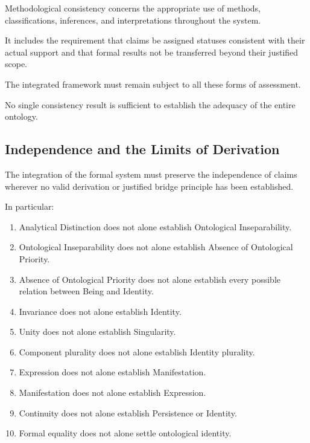 Methodological consistency
concerns the
appropriate use
of methods,
classifications,
inferences, and
interpretations throughout
the system.

It includes
the requirement
that claims
be assigned
statuses consistent
with their
actual support
and that
formal results
not be
transferred beyond
their justified
scope.

The integrated framework
must remain subject
to all these
forms of assessment.

No single
consistency result
is sufficient
to establish
the adequacy
of the entire
ontology.

\subsection{Independence and the Limits of Derivation}

The integration of
the formal system
must preserve
the independence
of claims wherever
no valid derivation
or justified
bridge principle
has been established.

In particular:

\begin{enumerate}
    \item Analytical Distinction
    does not alone
    establish Ontological
    Inseparability.

    \item Ontological Inseparability
    does not alone
    establish Absence
    of Ontological
    Priority.

    \item Absence of
    Ontological Priority
    does not alone
    establish every
    possible relation
    between Being
    and Identity.

    \item Invariance
    does not alone
    establish Identity.

    \item Unity
    does not alone
    establish Singularity.

    \item Component plurality
    does not alone
    establish Identity
    plurality.

    \item Expression
    does not alone
    establish Manifestation.

    \item Manifestation
    does not alone
    establish Expression.

    \item Continuity
    does not alone
    establish Persistence
    or Identity.

    \item Formal equality
    does not alone
    settle ontological
    identity.
\end{enumerate}

